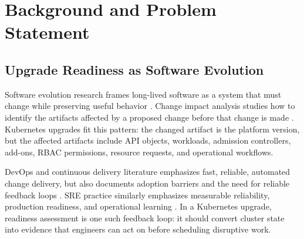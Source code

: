 \documentclass[10pt,journal]{IEEEtran}
\begin{document}
\section{Background and Problem Statement}
\subsection{Upgrade Readiness as Software Evolution}
Software evolution research frames long-lived software as a system that must change while preserving useful behavior \cite{lehman1980,mens2008}. Change impact analysis studies how to identify the artifacts affected by a proposed change before that change is made \cite{bohner1996}. Kubernetes upgrades fit this pattern: the changed artifact is the platform version, but the affected artifacts include API objects, workloads, admission controllers, add-ons, RBAC permissions, resource requests, and operational workflows.

DevOps and continuous delivery literature emphasizes fast, reliable, automated change delivery, but also documents adoption barriers and the need for reliable feedback loops \cite{humbleFarley2010,chen2015,shahin2017,smeds2015,leite2019,forsgren2018}. SRE practice similarly emphasizes measurable reliability, production readiness, and operational learning \cite{beyer2016,nygard2018}. In a Kubernetes upgrade, readiness assessment is one such feedback loop: it should convert cluster state into evidence that engineers can act on before scheduling disruptive work.
\end{document}
